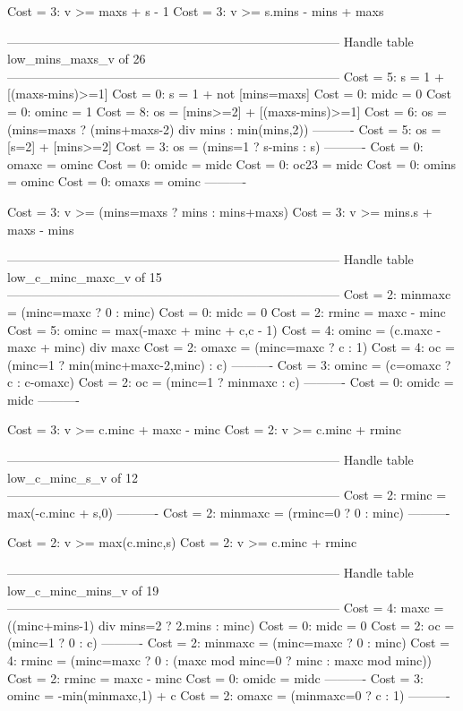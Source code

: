 Cost =  3:  v >= maxs + s - 1
Cost =  3:  v >= s.mins - mins + maxs

--------------------------------------------------------------------------------
Handle table low_mins_maxs_v of 26
--------------------------------------------------------------------------------
Cost =  5:  s     = 1 + [(maxs-mins)>=1]
Cost =  0:  s     = 1 + not [mins=maxs]
Cost =  0:  midc  = 0
Cost =  0:  ominc = 1
Cost =  8:  os    = [mins>=2] + [(maxs-mins)>=1]
Cost =  6:  os    = (mins=maxs ? (mins+maxs-2) div mins : min(mins,2))
----------
Cost =  5:  os    = [s=2] + [mins>=2]
Cost =  3:  os    = (mins=1 ? s-mins : s)
----------
Cost =  0:  omaxc = ominc
Cost =  0:  omidc = midc
Cost =  0:  oc23  = midc
Cost =  0:  omins = ominc
Cost =  0:  omaxs = ominc
----------

Cost =  3:  v >= (mins=maxs ? mins : mins+maxs)
Cost =  3:  v >= mins.s + maxs - mins

--------------------------------------------------------------------------------
Handle table low_c_minc_maxc_v of 15
--------------------------------------------------------------------------------
Cost =  2:  minmaxc = (minc=maxc ? 0 : minc)
Cost =  0:  midc    = 0
Cost =  2:  rminc   = maxc - minc
Cost =  5:  ominc   = max(-maxc + minc + c,c - 1)
Cost =  4:  ominc   = (c.maxc - maxc + minc) div maxc
Cost =  2:  omaxc   = (minc=maxc ? c : 1)
Cost =  4:  oc      = (minc=1 ? min(minc+maxc-2,minc) : c)
----------
Cost =  3:  ominc   = (c=omaxc ? c : c-omaxc)
Cost =  2:  oc      = (minc=1 ? minmaxc : c)
----------
Cost =  0:  omidc   = midc
----------

Cost =  3:  v >= c.minc + maxc - minc
Cost =  2:  v >= c.minc + rminc

--------------------------------------------------------------------------------
Handle table low_c_minc_s_v of 12
--------------------------------------------------------------------------------
Cost =  2:  rminc   = max(-c.minc + s,0)
----------
Cost =  2:  minmaxc = (rminc=0 ? 0 : minc)
----------

Cost =  2:  v >= max(c.minc,s)
Cost =  2:  v >= c.minc + rminc

--------------------------------------------------------------------------------
Handle table low_c_minc_mins_v of 19
--------------------------------------------------------------------------------
Cost =  4:  maxc    = ((minc+mins-1) div mins=2 ? 2.mins : minc)
Cost =  0:  midc    = 0
Cost =  2:  oc      = (minc=1 ? 0 : c)
----------
Cost =  2:  minmaxc = (minc=maxc ? 0 : minc)
Cost =  4:  rminc   = (minc=maxc ? 0 : (maxc mod minc=0 ? minc : maxc mod minc))
Cost =  2:  rminc   = maxc - minc
Cost =  0:  omidc   = midc
----------
Cost =  3:  ominc   = -min(minmaxc,1) + c
Cost =  2:  omaxc   = (minmaxc=0 ? c : 1)
----------

